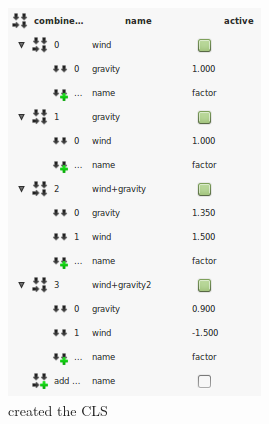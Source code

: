 \begin{minipage}[h]{8cm}
\begin{figure}[H]
\begin{center}
\includegraphics[width=\textwidth-1cm]{../pictures/scriptclscreated.png}
\caption{created the CLS}
\label{pic:scriptclscreated}
\end{center}
\end{figure}
\end{minipage}\\

